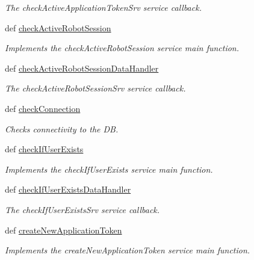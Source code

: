 \begin{DoxyCompactItemize}
\begin{DoxyCompactList}\small\item\em The check\-Active\-Application\-Token\-Srv service callback. \end{DoxyCompactList}\item 
def \hyperlink{classmysql__wrapper_1_1MySQLdbWrapper_a1ffb3748110b8e877dd0091a2b79c7f5}{check\-Active\-Robot\-Session}
\begin{DoxyCompactList}\small\item\em Implements the check\-Active\-Robot\-Session service main function. \end{DoxyCompactList}\item 
def \hyperlink{classmysql__wrapper_1_1MySQLdbWrapper_a0c4575d1dcfb00fbbc371a8ba578e2ed}{check\-Active\-Robot\-Session\-Data\-Handler}
\begin{DoxyCompactList}\small\item\em The check\-Active\-Robot\-Session\-Srv service callback. \end{DoxyCompactList}\item 
def \hyperlink{classmysql__wrapper_1_1MySQLdbWrapper_a799119b4e8ddbe43c6e6104a24e00810}{check\-Connection}
\begin{DoxyCompactList}\small\item\em Checks connectivity to the D\-B. \end{DoxyCompactList}\item 
def \hyperlink{classmysql__wrapper_1_1MySQLdbWrapper_a25a3fcc21534a4b7b0f4101b3cd22375}{check\-If\-User\-Exists}
\begin{DoxyCompactList}\small\item\em Implements the check\-If\-User\-Exists service main function. \end{DoxyCompactList}\item 
def \hyperlink{classmysql__wrapper_1_1MySQLdbWrapper_ab5dad27ab00239ccd23505e8d1dffbca}{check\-If\-User\-Exists\-Data\-Handler}
\begin{DoxyCompactList}\small\item\em The check\-If\-User\-Exists\-Srv service callback. \end{DoxyCompactList}\item 
def \hyperlink{classmysql__wrapper_1_1MySQLdbWrapper_af4b058ca92dde961f22c587ee99330b4}{create\-New\-Application\-Token}
\begin{DoxyCompactList}\small\item\em Implements the create\-New\-Application\-Token service main function. \end{DoxyCompactList}\item 

\end{DoxyCompactItemize}
